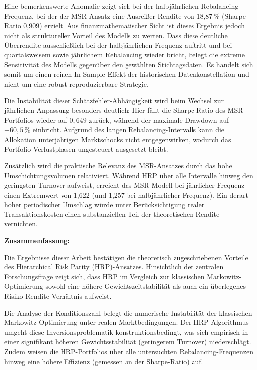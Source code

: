 \documentclass[parskip=half]{scrartcl}
\begin{document}
	Eine bemerkenswerte Anomalie zeigt sich bei der halbjährlichen Rebalancing-Frequenz, bei der der MSR-Ansatz eine Ausreißer-Rendite von 18,87\,\% (Sharpe-Ratio 0,909) erzielt. Aus finanzmathematischer Sicht ist dieses Ergebnis jedoch nicht als struktureller Vorteil des Modells zu werten. Dass diese deutliche Überrendite ausschließlich bei der halbjährlichen Frequenz auftritt und bei quartalsweisem sowie jährlichem Rebalancing wieder bricht, belegt die extreme Sensitivität des Modells gegenüber den gewählten Stichtagsdaten. Es handelt sich somit um einen reinen In-Sample-Effekt der historischen Datenkonstellation und nicht um eine robust reproduzierbare Strategie.
	
	Die Instabilität dieser Schätzfehler-Abhängigkeit wird beim Wechsel zur jährlichen Anpassung besonders deutlich: Hier fällt die Sharpe-Ratio des MSR-Portfolios wieder auf $0,649$ zurück, während der maximale Drawdown auf $-60,5\,\%$ einbricht. Aufgrund des langen Rebalancing-Intervalls kann die Allokation unterjährigen Marktschocks nicht entgegenwirken, wodurch das Portfolio Verlustphasen ungesteuert ausgesetzt bleibt.
	
	Zusätzlich wird die praktische Relevanz des MSR-Ansatzes durch das hohe Umschichtungsvolumen relativiert. Während HRP über alle Intervalle hinweg den geringsten Turnover aufweist, erreicht das MSR-Modell bei jährlicher Frequenz einen Extremwert von 1,622 (und 1,257 bei halbjährlicher Frequenz). Ein derart hoher periodischer Umschlag würde unter Berücksichtigung realer Transaktionskosten einen substanziellen Teil der theoretischen Rendite vernichten.
	
	
	
	\clearpage
	
	\textbf{Zusammenfassung:} 
	
	Die Ergebnisse dieser Arbeit bestätigen die theoretisch zugeschriebenen Vorteile des Hierarchical Risk Parity (HRP)-Ansatzes. Hinsichtlich der zentralen Forschungsfrage zeigt sich, dass HRP im Vergleich zur klassischen Markowitz-Optimierung sowohl eine höhere Gewichtszeitstabilität als auch ein überlegenes Risiko-Rendite-Verhältnis aufweist.
	
	Die Analyse der Konditionszahl belegt die numerische Instabilität der klassischen Markowitz-Optimierung unter realen Marktbedingungen. Der HRP-Algorithmus umgeht diese Inversionsproblematik konstruktionsbedingt, was sich empirisch in einer signifikant höheren Gewichtsstabilität (geringerem Turnover) niederschlägt. Zudem weisen die HRP-Portfolios über alle untersuchten Rebalancing-Frequenzen hinweg eine höhere Effizienz (gemessen an der Sharpe-Ratio) auf.
	
\end{document}
